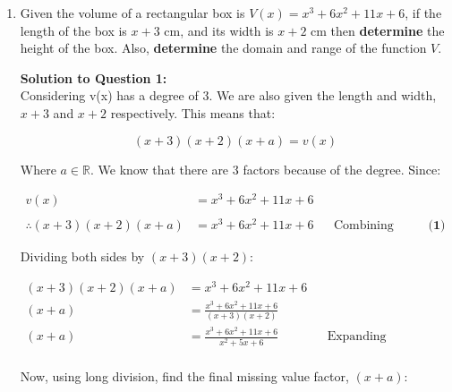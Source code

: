 \documentclass[12pt]{book}
\begin{document}
\begin{enumerate}

\item Given the volume of a rectangular box is $V(x) = x^3 + 6x^2 + 11x + 6$, if the length of the box is $x+3$ cm, and its width is $x+2$ cm then \textbf{determine} the height of the box. Also, \textbf{determine} the domain and range of the function $V$.


\vspace{0.3cm} 
\textbf{Solution to Question 1:}\\

 Considering v(x) has a degree of 3. We are also given the length and width, $x+3$ and $x+2$ respectively. This means that:

 $$(x+3)(x+2)(x+a) = v(x)$$

 Where $a \in \mathbb{R}$. We know that there are 3 factors because of the degree. Since:

 \begin{align*}
    v(x) &= x^3+6x^2+11x+6 \\
    \\
    \therefore (x+3)(x+2)(x+a) &= x^3+6x^2+11x+6 && \text{Combining the previously listed equations} && \textbf{(1)}
 \end{align*}

 Dividing both sides by $(x+3)(x+2)$:

 \addtolength{\jot}{1em}
 \begin{align*}
    (x+3)(x+2)(x+a) &= x^3+6x^2+11x+6 \\
    (x+a) &= \frac{x^3+6x^2+11x+6}{(x+3)(x+2)} \\
    (x+a) &= \frac{x^3+6x^2+11x+6}{x^2+5x+6} && \text{Expanding denominator bracket} \\
 \end{align*}
 
 \vspace{-3.5em}
 \begin{center}
     Now, using long division, find the final missing value factor, $(x+a)$:
 \end{center}
 \vspace{-2em}


\end{enumerate}
\end{document}
